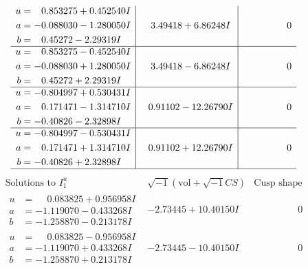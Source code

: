 \documentclass[1p]{elsarticle_modified}
\theoremstyle{definition}
\newcommand{\I}{\sqrt{-1}}
\begin{document}
$$\begin{array}{c|c|c}
\begin{aligned}
u &= \phantom{-}0.853275 + 0.452540 I \\
a &= -0.088030 - 1.280050 I \\
b &= \phantom{-}0.45272 - 2.29319 I\end{aligned}
 & \phantom{-}3.49418 + 6.86248 I & \phantom{-0.000000 } 0 \\ \hline\begin{aligned}
u &= \phantom{-}0.853275 - 0.452540 I \\
a &= -0.088030 + 1.280050 I \\
b &= \phantom{-}0.45272 + 2.29319 I\end{aligned}
 & \phantom{-}3.49418 - 6.86248 I & \phantom{-0.000000 } 0 \\ \hline\begin{aligned}
u &= -0.804997 + 0.530431 I \\
a &= \phantom{-}0.171471 - 1.314710 I \\
b &= -0.40826 - 2.32898 I\end{aligned}
 & \phantom{-}0.91102 - 12.26790 I & \phantom{-0.000000 } 0 \\ \hline\begin{aligned}
u &= -0.804997 - 0.530431 I \\
a &= \phantom{-}0.171471 + 1.314710 I \\
b &= -0.40826 + 2.32898 I\end{aligned}
 & \phantom{-}0.91102 + 12.26790 I & \phantom{-0.000000 } 0\\
 \hline 
 \end{array}$$\newpage$$\begin{array}{c|c|c}  
\text{Solutions to }I^u_{1}& \I (\text{vol} + \sqrt{-1}CS) & \text{Cusp shape}\\
 \hline 
\begin{aligned}
u &= \phantom{-}0.083825 + 0.956958 I \\
a &= -1.119070 - 0.433268 I \\
b &= -1.258870 - 0.213178 I\end{aligned}
 & -2.73445 + 10.40150 I & \phantom{-0.000000 } 0 \\ \hline\begin{aligned}
u &= \phantom{-}0.083825 - 0.956958 I \\
a &= -1.119070 + 0.433268 I \\
b &= -1.258870 + 0.213178 I\end{aligned}
 & -2.73445 - 10.40150 I & \phantom{-0.000000 } 0 \\ \hline\begin{aligned}

\end{aligned}
\end{array}$$
\end{document}
